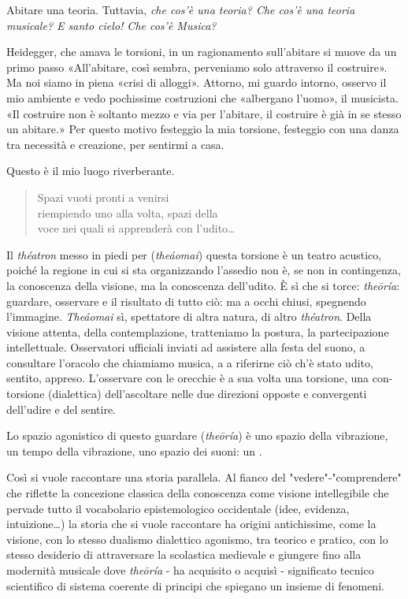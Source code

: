 \documentclass{gs}
\begin{document}
Abitare una teoria. Tuttavia, \emph{che cos'è una teoria? Che cos'è una teoria musicale? E santo cielo! Che cos'è Musica?}

Heidegger, che amava le torsioni, in un ragionamento sull'abitare \cite{heidegger1991} si muove da un primo passo «All'abitare, così sembra, perveniamo solo attraverso il costruire». Ma noi siamo in piena «crisi di alloggi». Attorno, mi guardo intorno, osservo il mio ambiente e vedo pochissime costruzioni che «albergano l'uomo», il musicista. «Il costruire non è soltanto mezzo e via per l'abitare, il costruire è già in se stesso un abitare.» Per questo motivo festeggio la mia torsione, festeggio con una danza tra necessità e creazione, per sentirmi a casa. 

Questo è il mio luogo riverberante.

\begin{quote}
Spazi vuoti pronti a venirsi\\
riempiendo uno alla volta, spazi della\\
voce nei quali si apprenderà con l'udito\ldots
\end{quote}

Il \emph{théatron} messo in piedi per (\emph{theáomai}) questa torsione è un teatro acustico, poiché la regione in cui si sta organizzando l'assedio non è, se non in contingenza, la conoscenza della visione, ma la conoscenza dell'udito. È sì che si torce: \emph{theōría}: guardare, osservare e il risultato di tutto ciò: ma a occhi chiusi, spegnendo l'immagine. \emph{Theáomai} sì, spettatore di altra natura, di altro \emph{théatron}. Della visione attenta, della contemplazione, tratteniamo la postura, la partecipazione intellettuale. Osservatori ufficiali inviati ad assistere alla festa del suono, a consultare l'oracolo che chiamiamo musica, a a riferirne ciò ch'è stato udito, sentito, appreso.  L'osservare con le orecchie è a sua volta una torsione, una con-torsione (dialettica) dell'ascoltare nelle due direzioni opposte e convergenti dell'udire e del sentire. 

Lo spazio agonistico di questo guardare (\emph{theōría}) è uno spazio della vibrazione, un tempo della vibrazione, uno spazio dei suoni: un . 

Così si vuole raccontare una storia parallela. Al fianco del "vedere"-"comprendere" che riflette la concezione classica della conoscenza come visione intellegibile che pervade tutto il vocabolario epistemologico occidentale (idee, evidenza, intuizione\ldots) la storia che si vuole raccontare ha origini antichissime, come la visione, con lo stesso dualismo dialettico agonismo, tra teorico e pratico, con lo stesso desiderio di attraversare la scolastica medievale e giungere fino alla modernità musicale dove \emph{theōría} - ha acquisito o acquisì - significato tecnico scientifico di sistema coerente di principi che spiegano un insieme di fenomeni.
\end{document}
